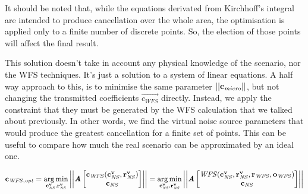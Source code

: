 It should be noted that, while the equations derivated from Kirchhoff's integral are intended to produce cancellation over the whole area, the optimisation is applied only to a finite number of discrete points. So, the election of those points will affect the final result.

This solution doesn't take in account any physical knowledge of the scenario, nor the WFS techniques. It's just a solution to a system of linear equations. A half way approach to this, is to minimise the same parameter $\left|\left| \mathbf{c_\mathit{micro}} \right|\right|$, but not changing the transmitted coefficients $\vec{c_{\mathit{WFS}}}$ directly. Instead, we apply the constraint that they must be generated by the WFS calculation that we talked about previously. In other words, we find the virtual noise source parameters that would produce the greatest cancellation for a finite set of points. This can be useful to compare how much the real scenario can be approximated by an ideal one.

\begin{equation}
\mathbf{c_{\mathit{WFS}, \mathit{opt}}} =
\operatorname*{arg\,min}_{\mathbf{c_\mathit{NS}^v}, \mathbf{r_{\mathit{NS}}^v}}
\left|\left| \bm{\mathit{A}}
	\begin{bmatrix}
	\mathbf{c_\mathit{WFS}}(\mathbf{c_\mathit{NS}^v}, \mathbf{r_{\mathit{NS}}^v})\\
	\mathbf{c_\mathit{NS}}\\
	\end{bmatrix}
 \right|\right| =
\operatorname*{arg\,min}_{\mathbf{c_\mathit{NS}^v}, \mathbf{r_{\mathit{NS}}^v}}
\left|\left| \bm{\mathit{A}}
	\begin{bmatrix}
	\mathit{WFS}(\mathbf{c_\mathit{NS}^v}, \mathbf{r_{\mathit{NS}}^v}, \mathbf{r}_\mathit{WFS}, \mathbf{o}_\mathit{WFS})\\
	\mathbf{c_\mathit{NS}}\\
	\end{bmatrix}
 \right|\right|
\end{equation}
